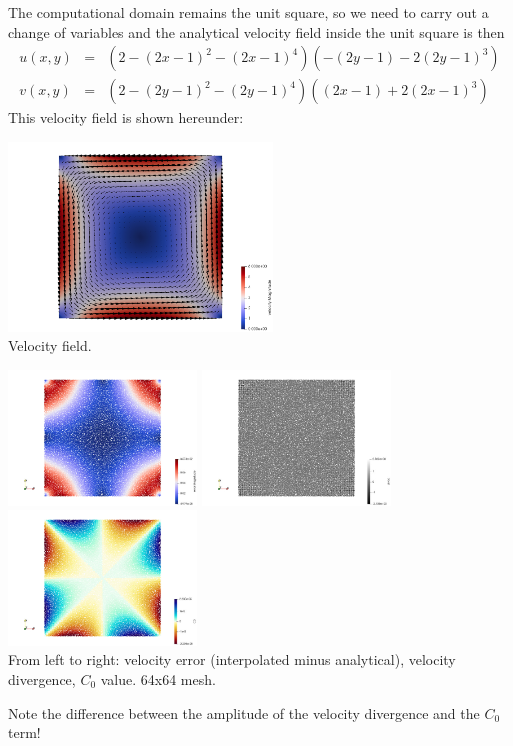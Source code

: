 The computational domain remains the unit square, so we need to carry out 
a change of variables and the analytical velocity field inside the unit square is then 
\begin{eqnarray}
u(x,y)&=&(2-(2x-1)^2-(2x-1)^4)(-(2y-1)-2(2y-1)^3) \\
v(x,y)&=&(2-(2y-1)^2-(2y-1)^4)( (2x-1)+2(2x-1)^3)
\end{eqnarray}
This velocity field is shown hereunder:
\begin{center}
\includegraphics[width=7cm]{python_codes/fieldstone_30/results_box/vel}\\
{\captionfont Velocity field.}
\end{center}

\begin{center}
\includegraphics[width=5cm]{python_codes/fieldstone_30/results_box/error}
\includegraphics[width=5cm]{python_codes/fieldstone_30/results_box/divv}
\includegraphics[width=5cm]{python_codes/fieldstone_30/results_box/C0}\\
{\captionfont From left to right: velocity error (interpolated minus analytical),
velocity divergence, $C_0$ value. 64x64 mesh. } 
\end{center}
Note the difference between the amplitude of the velocity divergence and the $C_0$ term!

